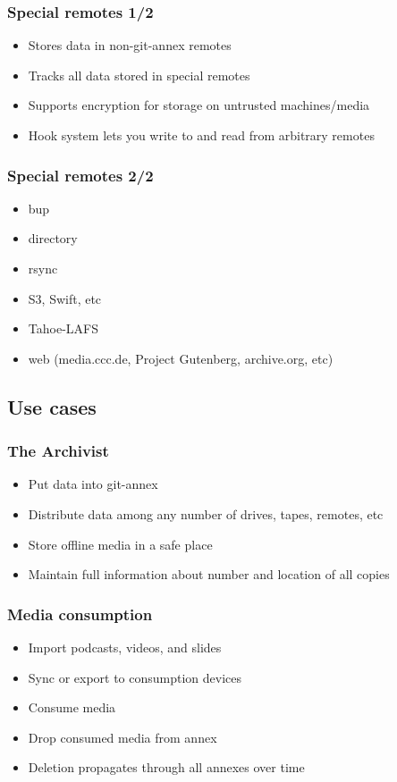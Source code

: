 \documentclass[t]{beamer}
\begin{document}
\begin{frame}
	\frametitle{Special remotes 1/2}
	\begin{itemize}
		\item Stores data in non-git-annex remotes
		\item Tracks all data stored in special remotes
		\item Supports encryption for storage on untrusted machines/media
		\item Hook system lets you write to and read from arbitrary remotes
	\end{itemize}
\end{frame}

\begin{frame}
	\frametitle{Special remotes 2/2}
	\begin{itemize}
		\item bup
		\item directory
		\item rsync
		\item S3, Swift, etc
		\item Tahoe-LAFS
		\item web (media.ccc.de, Project Gutenberg, archive.org, etc)
	\end{itemize}
\end{frame}


\subsection{Use cases}

\begin{frame}
	\frametitle{The Archivist}
	\begin{itemize}
		\item Put data into git-annex
		\item Distribute data among any number of drives, tapes, remotes, etc
		\item Store offline media in a safe place
		\item Maintain full information about number and location of all copies
	\end{itemize}
\end{frame}

\begin{frame}
	\frametitle{Media consumption}
	\begin{itemize}
		\item Import podcasts, videos, and slides
		\item Sync or export to consumption devices
		\item Consume media
		\item Drop consumed media from annex
		\item Deletion propagates through all annexes over time
	\end{itemize}
\end{frame}
\end{document}
